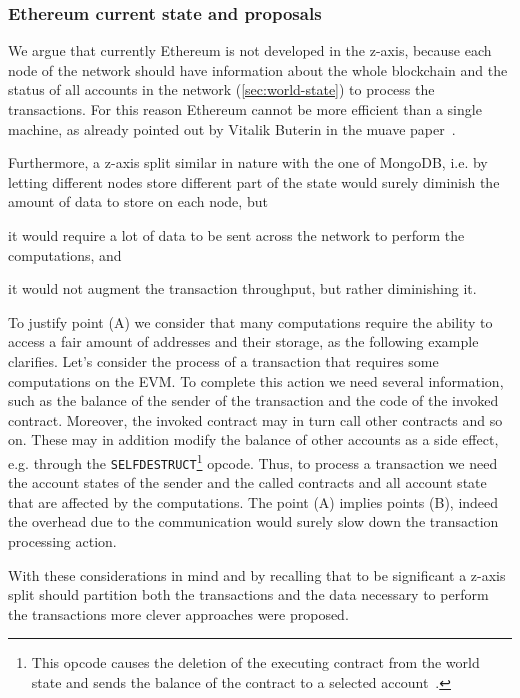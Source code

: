 \subsubsection{Ethereum current state and proposals}
We argue that currently Ethereum is not developed in the z-axis, because each
node of the network should have information about the whole blockchain and the
status of all accounts in the network (\autoref{sec:world-state}) to process the
transactions. For this reason Ethereum cannot be more efficient than a single
machine, as already pointed out by Vitalik Buterin in the muave
paper~\cite{bib:mauve}.

Furthermore, a z-axis split similar in nature with the one of MongoDB, i.e.
by letting different nodes store different part of the state would surely
diminish the amount of data to store on each node, but
\begin{enumerate*}[label=(\Alph*)]
  \item it would require a lot of data to be sent across the network to
  perform the computations, and
  \item it would not augment the transaction throughput, but rather
  diminishing it.
\end{enumerate*}
To justify point (A) we consider that many computations require the ability to
access a fair amount of addresses and their storage, as the following example
clarifies. Let's consider the process of a transaction that requires some
computations on the EVM. To complete this action we need several information,
such as the balance of the sender of the transaction and the code of the
invoked contract. Moreover, the invoked contract may in turn call other
contracts and so on. These may in addition modify the balance of other accounts
as a side effect, e.g. through the \texttt{SELFDESTRUCT}\footnote{This opcode
causes the deletion of the executing contract from the world state and sends
the balance of the contract to a selected
account~\cite{wood2018ethereum}.} opcode. Thus, to process a transaction we
need the account states of the sender and the called contracts and all account
state that are affected by the computations. The point (A) implies points (B),
indeed the overhead due to the communication would surely slow down the
transaction processing action.

With these considerations in mind and by recalling that to be significant a
z-axis split should partition both the transactions and the data necessary to
perform the transactions more clever approaches were proposed.

